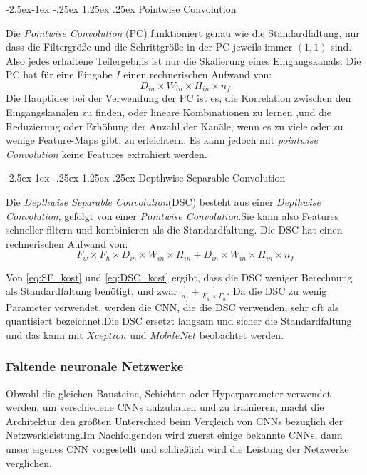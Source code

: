 \documentclass[12pt,a4paper]{scrartcl}
\makeatletter
\numberwithin{equation}{section}
\renewcommand\paragraph{\@startsection{paragraph}{4}{\z@}%
	{-2.5ex\@plus -1ex \@minus -.25ex}%
	{1.25ex \@plus .25ex}%
	{\normalfont\normalsize\bfseries}}
\makeatother
\begin{document}
\paragraph{Pointwise Convolution}\label{Pointwise}

Die \textit{Pointwise Convolution} (PC) funktioniert genau wie die Standardfaltung, nur dass die Filtergröße  und die Schrittgröße in der PC jeweils immer $ (1,1) $ sind. Also jedes erhaltene Teilergebnis ist nur die Skalierung eines Eingangskanals. Die PC hat für eine Eingabe $ I $ einen rechnerischen Aufwand von:
\begin{equation}\label{eq:PT_kost}
	 D_{in}\times W_{in}\times H_{in} \times n_f
\end{equation}
Die Hauptidee bei der Verwendung der PC ist es, die Korrelation zwischen den Eingangskanälen zu finden, oder lineare Kombinationen zu lernen ,und  die Reduzierung oder Erhöhung der Anzahl der Kanäle, wenn es zu viele oder zu wenige Feature-Maps gibt, zu erleichtern. Es kann jedoch mit \textit{pointwise Convolution} keine Features extrahiert werden.

\paragraph{Depthwise Separable Convolution} \label{DSC}

Die \textit{Depthwise Separable Convolution}(DSC) besteht aus einer \textit{Depthwise Convolution}, gefolgt von einer \textit{Pointwise Convolution}.Sie kann also Features schneller filtern und kombinieren als die Standardfaltung. Die DSC hat einen rechnerischen Aufwand von:
\begin{equation}\label{eq:DSC_kost}
F_w\times F_h \times D_{in}\times W_{in}\times H_{in} + D_{in}\times W_{in}\times H_{in} \times n_f
\end{equation}

Von \ref{eq:SF_kost} und \ref{eq:DSC_kost} ergibt, dass die DSC weniger Berechnung als Standardfaltung benötigt, und zwar $ \frac{1}{n_f} + \frac{1}{F_w\times F_h}$. Da die DSC zu wenig Parameter verwendet, werden die \ac{CNN}, die die DSC verwenden, sehr oft als quantisiert bezeichnet.Die DSC ersetzt langsam und sicher die Standardfaltung und das kann mit $ Xception $ und $ MobileNet $ beobachtet werden.

\subsubsection{Faltende neuronale Netzwerke}\label{CNN}
Obwohl die gleichen Bausteine, Schichten oder Hyperparameter verwendet werden, um verschiedene \acsp{CNN} aufzubauen und zu trainieren, macht die Architektur den größten Unterschied beim Vergleich von {CNNs} bezüglich der Netzwerkleistung.Im Nachfolgenden wird zuerst einige bekannte \acsp{CNN}, dann unser eigenes {CNN} vorgestellt und schließlich wird die Leistung der Netzwerke verglichen.
\end{document}

